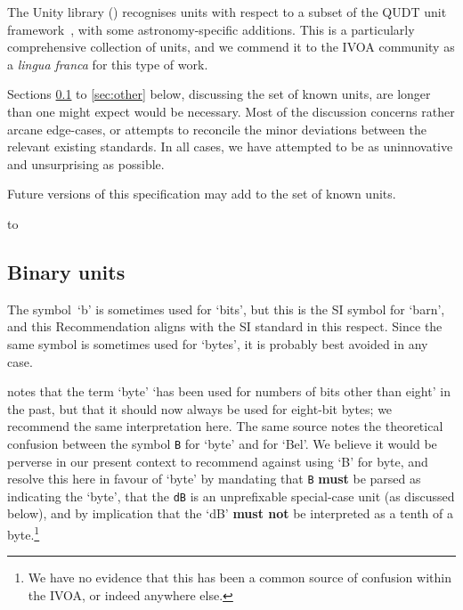 \documentclass[11pt,notitlepage,onecolumn]{ivoa}
\newcommand*\norm[1]{\textbf{\color{ivoacolor}#1}}
\newcommand{\unit}[1]{\texttt{\small\color{orange}#1}}
\begin{document}
The Unity library () recognises units with
respect to a subset of the QUDT unit framework~\cite{qudt}, with some
astronomy-specific additions.  This is a particularly comprehensive
collection of units, and we commend it to the IVOA community as
a \emph{lingua franca} for this type of work.

Sections \ref{sec:binary} to \ref{sec:other} below, discussing the set
of known units, are longer than one might expect would be necessary.
Most of the discussion concerns rather arcane edge-cases, or attempts
to reconcile the minor deviations between the relevant existing
standards.  In all cases, we have attempted to be as uninnovative and
unsurprising as possible.

Future versions of this specification may add to the set of known units.

\begin{table}
\hbox to 
\caption[Known units in the various syntaxes]
{\label{tabx:knownunits}Known units in the various syntaxes.
In the table, and for a given syntax, a `$\cdot$' indicates that the unit is recognised,
an~`s' that it is additionally permitted to have SI prefixes,
a~`b' that binary prefixes will be recognised,
and a~`d' that it is recognised but deprecated.
For those units which have alternative symbols for a given unit,
a~`p' indicates the preferred one.}
\end{table}

\subsection{Binary units}
\label{sec:binary}

The symbol~`b' is sometimes used for `bits', but this is the SI symbol
for `barn', and this Recommendation aligns with the SI standard in
this respect.  Since the same symbol is sometimes used for `bytes', it
is probably best avoided in any case.

\citet[item 13-9.c]{std:iec80000-13} notes that the term `byte'
`has been used for numbers of bits other than eight' in the past, but
that it should now always be used for eight-bit bytes; we recommend
the same interpretation here.  The same source notes the theoretical
confusion between the symbol \unit{B} for `byte' and for `Bel'.  We
believe it would be perverse in our present context to recommend
against using `B' for byte, and resolve this here
in favour of `byte' by mandating that \unit{B} \norm{must} be parsed
as indicating the `byte', that the \unit{dB} is an
unprefixable special-case unit (as discussed below), and by
implication that the `dB'
\norm{must not} be interpreted as a tenth of a byte.\footnote{We have no
evidence that this has been a common source of confusion within the
IVOA, or indeed anywhere else.}
\end{document}
